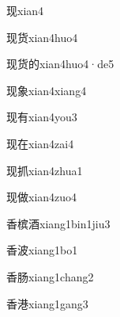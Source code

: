 \begin{verbete}[8]{现}{xian4}
\end{verbete}

\begin{verbete}[8;8]{现货}{xian4huo4}
\end{verbete}

\begin{verbete}[8;8;8]{现货的}{xian4huo4·de5}
\end{verbete}

\begin{verbete}[8;11]{现象}{xian4xiang4}
\end{verbete}

\begin{verbete}[8;6]{现有}{xian4you3}
\end{verbete}

\begin{verbete}[8;6]{现在}{xian4zai4}
\end{verbete}

\begin{verbete}[8;7]{现抓}{xian4zhua1}
\end{verbete}

\begin{verbete}[8;11]{现做}{xian4zuo4}
\end{verbete}

\begin{verbete}[9;14;10]{香槟酒}{xiang1bin1jiu3}
\end{verbete}

\begin{verbete}[9;8]{香波}{xiang1bo1}
\end{verbete}

\begin{verbete}[9;7]{香肠}{xiang1chang2}
\end{verbete}

\begin{verbete*}[9;12]{香港}{xiang1gang3}
\end{verbete*}

